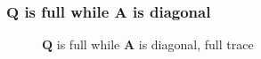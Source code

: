 \documentclass[]{article}
\begin{document}
\subsubsection{\(\mathbf{Q}\) is full while \(\mathbf{A}\) is diagonal}
\begin{figure}[h!]
	\caption{\(\mathbf{Q}\) is full while \(\mathbf{A}\) is diagonal, full trace}
	\label{full trace, diag A}
\end{figure}
\end{document}
